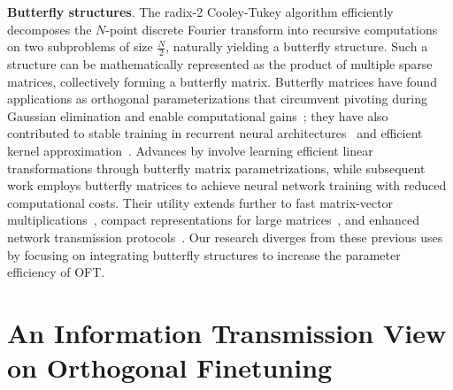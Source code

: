 \textbf{Butterfly structures}. The radix-2 Cooley-Tukey algorithm efficiently decomposes the $N$-point discrete Fourier transform into recursive computations on two subproblems of size $\frac{N}{2}$, naturally yielding a butterfly structure. Such a structure can be mathematically represented as the product of multiple sparse matrices, collectively forming a butterfly matrix. Butterfly matrices have found applications as orthogonal parameterizations that circumvent pivoting during Gaussian elimination and enable computational gains~\cite{parker1995random}; they have also contributed to stable training in recurrent neural architectures~\cite{jing2017tunable} and efficient kernel approximation~\cite{munkhoeva2018quadrature}. Advances by \cite{dao2019learning,dao2019kaleidoscope} involve learning efficient linear transformations through butterfly matrix parametrizations, while subsequent work \cite{chen2022pixelated,dao2022monarch} employs butterfly matrices to achieve neural network training with reduced computational costs. Their utility extends further to fast matrix-vector multiplications~\cite{michielssen1996multilevel,o2010algorithm}, compact representations for large matrices~\cite{li2015butterfly}, and enhanced network transmission protocols~\cite{klasing1994broadcasting,li2003linear,rajasingh2016transmission}. Our research diverges from these previous uses by focusing on integrating butterfly structures to increase the parameter efficiency of OFT.

\section{An Information Transmission View on Orthogonal Finetuning}

